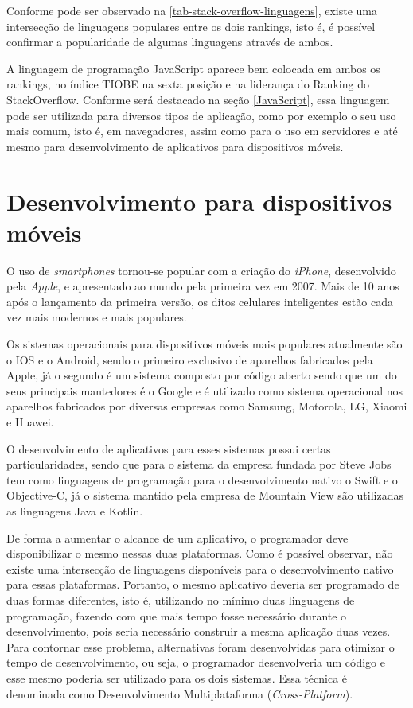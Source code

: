 \newpage
Conforme pode ser observado na \autoref{tab-stack-overflow-linguagens}, existe uma intersecção de linguagens populares entre os dois rankings, isto é, é possível confirmar a popularidade de algumas linguagens através de ambos.

A linguagem de programação JavaScript aparece bem colocada em ambos os rankings, no índice TIOBE\cite{tiobeDefinition} na sexta posição e na liderança do Ranking do StackOverflow\cite{stackOverflowRanking}. Conforme será destacado na seção \ref{JavaScript}, essa linguagem pode ser utilizada para diversos tipos de aplicação, como por exemplo o seu uso mais comum, isto é, em navegadores, assim como para o uso em servidores e até mesmo para desenvolvimento de aplicativos para dispositivos móveis.

\section{Desenvolvimento para dispositivos móveis}
\label{sec-desenvolvimento-apps}

O uso de \textit{smartphones} tornou-se popular com a criação do \textit{iPhone}, desenvolvido pela \textit{Apple}, e apresentado ao mundo pela primeira vez em 2007. Mais de 10 anos após o lançamento da primeira versão, os ditos celulares inteligentes estão cada vez mais modernos e mais populares.\cite{iphoneApple}


Os sistemas operacionais para dispositivos móveis mais populares atualmente são o IOS e o Android, sendo o primeiro exclusivo de aparelhos fabricados pela Apple, já o segundo é um sistema composto por código aberto sendo que um do seus principais mantedores é o Google e é utilizado como sistema operacional nos aparelhos fabricados por diversas empresas como Samsung, Motorola, LG, Xiaomi e Huawei.

O desenvolvimento de aplicativos para esses sistemas possui certas particularidades, sendo que para o sistema da empresa fundada por Steve Jobs tem como linguagens de programação para o desenvolvimento nativo o Swift e o Objective-C, já o sistema mantido pela empresa de Mountain View são utilizadas as linguagens Java e Kotlin.

De forma a aumentar o alcance de um aplicativo, o programador deve disponibilizar o mesmo nessas duas plataformas. Como é possível observar, não existe uma intersecção de linguagens disponíveis para o desenvolvimento nativo para essas plataformas. Portanto, o mesmo aplicativo deveria ser programado de duas formas diferentes, isto é, utilizando no mínimo duas linguagens de programação, fazendo com que mais tempo fosse necessário durante o desenvolvimento, pois seria necessário construir a mesma aplicação duas vezes. Para contornar esse problema, alternativas foram desenvolvidas para otimizar o tempo de desenvolvimento, ou seja, o programador desenvolveria um código e esse mesmo poderia ser utilizado para os dois sistemas. Essa técnica é denominada como Desenvolvimento Multiplataforma (\textit{Cross-Platform}).\cite{desenvolvimentoMobile}


